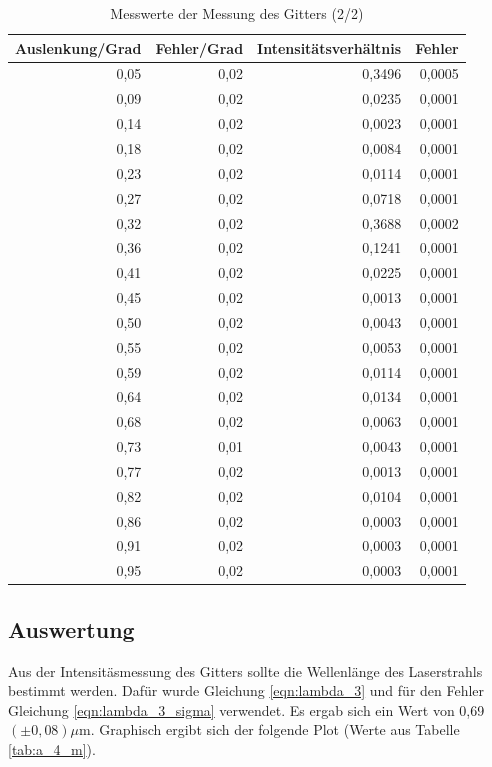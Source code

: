 \documentclass[12pt]{scrartcl}
\begin{document}
\begin{table}[H]
\caption{Messwerte der Messung des Gitters (2/2)}
\begin{center}
\begin{tabular}{|r|r|r|r|}
\hline
\multicolumn{1}{|l|}{Auslenkung/Grad} & \multicolumn{1}{l|}{Fehler/Grad} & \multicolumn{1}{l|}{Intensitätsverhältnis} & \multicolumn{1}{l|}{Fehler} \\ \hline
0,05 & 0,02 & 0,3496 & 0,0005 \\ \hline
0,09 & 0,02 & 0,0235 & 0,0001 \\ \hline
0,14 & 0,02 & 0,0023 & 0,0001 \\ \hline
0,18 & 0,02 & 0,0084 & 0,0001 \\ \hline
0,23 & 0,02 & 0,0114 & 0,0001 \\ \hline
0,27 & 0,02 & 0,0718 & 0,0001 \\ \hline
0,32 & 0,02 & 0,3688 & 0,0002 \\ \hline
0,36 & 0,02 & 0,1241 & 0,0001 \\ \hline
0,41 & 0,02 & 0,0225 & 0,0001 \\ \hline
0,45 & 0,02 & 0,0013 & 0,0001 \\ \hline
0,50 & 0,02 & 0,0043 & 0,0001 \\ \hline
0,55 & 0,02 & 0,0053 & 0,0001 \\ \hline
0,59 & 0,02 & 0,0114 & 0,0001 \\ \hline
0,64 & 0,02 & 0,0134 & 0,0001 \\ \hline
0,68 & 0,02 & 0,0063 & 0,0001 \\ \hline
0,73 & 0,01 & 0,0043 & 0,0001 \\ \hline
0,77 & 0,02 & 0,0013 & 0,0001 \\ \hline
0,82 & 0,02 & 0,0104 & 0,0001 \\ \hline
0,86 & 0,02 & 0,0003 & 0,0001 \\ \hline
0,91 & 0,02 & 0,0003 & 0,0001 \\ \hline
0,95 & 0,02 & 0,0003 & 0,0001 \\ \hline
\end{tabular}
\end{center}
\label{tab:a_4_e_b}
\end{table}



\subsection{Auswertung}
Aus der Intensitäsmessung des Gitters sollte die Wellenlänge des Laserstrahls bestimmt werden. Dafür wurde Gleichung \ref{eqn:lambda_3} und für den Fehler Gleichung \ref{eqn:lambda_3_sigma} verwendet. Es ergab sich ein Wert von 0,69 $(\pm  0,08)\mu$m. Graphisch ergibt sich der folgende Plot (Werte aus Tabelle \ref{tab:a_4_m}).
\end{document}

